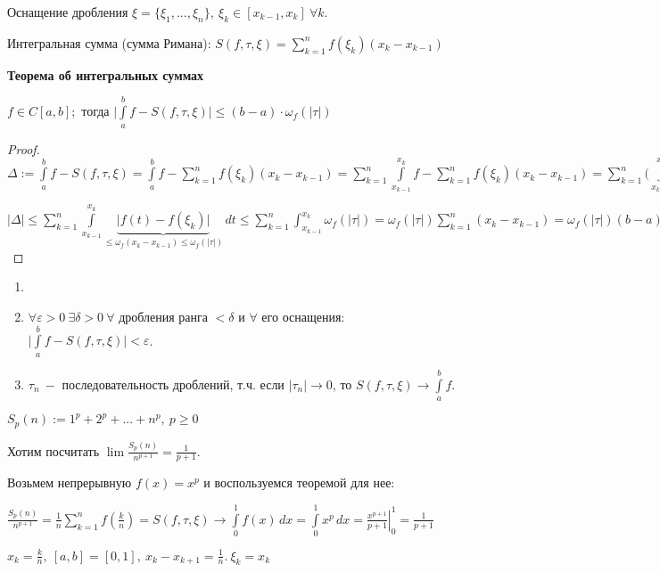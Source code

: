\begin{definition}
    Оснащение дробления $\xi=\{\xi_1,...,\xi_n\},\ \xi_k\in[x_{k-1},x_k]\ \forall k$.
\end{definition}

\begin{definition}
    Интегральная сумма (сумма Римана): $S(f,\tau,\xi)=\sum\limits_{k=1}^n f(\xi_k)(x_k-x_{k-1})$
\end{definition}

\begin{theorem} \textbf{Теорема об интегральных суммах}

    $f\in C[a,b];$ тогда $\bigg|\int\limits_{a}^b f-S(f,\tau,\xi)\bigg|\leq (b-a)\cdot \omega_f(|\tau|)$
\end{theorem}

\begin{proof}
    $\Delta:=\int\limits_{a}^b f-S(f,\tau,\xi)
    =\int\limits_{a}^b f-\sum\limits_{k=1}^n f(\xi_k)(x_k-x_{k-1}) 
    =\sum\limits_{k=1}^n \int\limits_{x_{k-1}}^{x_k} f-\sum\limits_{k=1}^n f(\xi_k)(x_k-x_{k-1})
    =\sum\limits_{k=1}^n \bigg(\int\limits_{x_{k-1}}^{x_k} f- f(\xi_k)(x_k-x_{k-1})\bigg)
    =\sum\limits_{k=1}^n \int\limits_{x_{k-1}}^{x_k} \bigg(f(t)-f(\xi_k)\bigg)\,dt$

    $|\Delta|\leq \sum\limits_{k=1}^n \int\limits_{x_{k-1}}^{x_k} \underbrace{\bigg|f(t)-f(\xi_k)\bigg|}_{\leq\omega_f(x_k-x_{k-1})\leq \omega_f(|\tau|)}\,dt\leq \sum\limits_{k=1}^n \int_{x_{k-1}}^{x_k} \omega_f(|\tau|)=\omega_f(|\tau|)\sum\limits_{k=1}^n(x_k-x_{k-1})=\omega_f(|\tau|)(b-a)$
\end{proof}

\begin{corollary}
    \begin{enumerate}
        \item[]
        \item $\forall\varepsilon>0\ \exists \delta>0\ \forall$ дробления ранга $<\delta$ и $\forall$ его оснащения: $\bigg|\int\limits_{a}^b f-S(f,\tau,\xi)\bigg|<\varepsilon$.
        \item $\tau_n\ -$ последовательность дроблений, т.ч. если $|\tau_n|\rightarrow 0$, то $S(f,\tau,\xi)\rightarrow \int\limits_{a}^b f$.
    \end{enumerate}
\end{corollary}

\begin{example}
    $S_p(n):=1^p+2^p+...+n^p,\ p\geq 0$

    Хотим посчитать $\lim\frac{S_p(n)}{n^{p+1}}=\frac{1}{p+1}$.

    Возьмем непрерывную $f(x)=x^p$ и воспользуемся теоремой для нее:

    $\frac{S_p(n)}{n^{p+1}}=\frac{1}{n}\sum\limits_{k=1}^n f(\frac{k}{n})=S(f, \tau, \xi)\rightarrow \int\limits_0^1 f(x)\,dx=\int\limits_0^1 x^p\,dx=\left.\frac{x^{p+1}}{p+1}\right|_0^1=\frac{1}{p+1}$

    $x_k=\frac{k}{n},\ [a,b]=[0,1],\ x_k-x_{k+1}=\frac{1}{n}.\ \xi_k=x_k$
\end{example}

